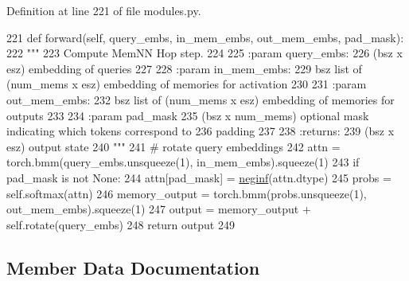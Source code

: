 Definition at line 221 of file modules.\+py.


\begin{DoxyCode}
221     \textcolor{keyword}{def }forward(self, query\_embs, in\_mem\_embs, out\_mem\_embs, pad\_mask):
222         \textcolor{stringliteral}{"""}
223 \textcolor{stringliteral}{        Compute MemNN Hop step.}
224 \textcolor{stringliteral}{}
225 \textcolor{stringliteral}{        :param query\_embs:}
226 \textcolor{stringliteral}{            (bsz x esz) embedding of queries}
227 \textcolor{stringliteral}{}
228 \textcolor{stringliteral}{        :param in\_mem\_embs:}
229 \textcolor{stringliteral}{            bsz list of (num\_mems x esz) embedding of memories for activation}
230 \textcolor{stringliteral}{}
231 \textcolor{stringliteral}{        :param out\_mem\_embs:}
232 \textcolor{stringliteral}{            bsz list of (num\_mems x esz) embedding of memories for outputs}
233 \textcolor{stringliteral}{}
234 \textcolor{stringliteral}{        :param pad\_mask}
235 \textcolor{stringliteral}{            (bsz x num\_mems) optional mask indicating which tokens correspond to}
236 \textcolor{stringliteral}{            padding}
237 \textcolor{stringliteral}{}
238 \textcolor{stringliteral}{        :returns:}
239 \textcolor{stringliteral}{            (bsz x esz) output state}
240 \textcolor{stringliteral}{        """}
241         \textcolor{comment}{# rotate query embeddings}
242         attn = torch.bmm(query\_embs.unsqueeze(1), in\_mem\_embs).squeeze(1)
243         \textcolor{keywordflow}{if} pad\_mask \textcolor{keywordflow}{is} \textcolor{keywordflow}{not} \textcolor{keywordtype}{None}:
244             attn[pad\_mask] = \hyperlink{namespaceparlai_1_1utils_1_1misc_a68c44ca571de7149b683539db659c330}{neginf}(attn.dtype)
245         probs = self.softmax(attn)
246         memory\_output = torch.bmm(probs.unsqueeze(1), out\_mem\_embs).squeeze(1)
247         output = memory\_output + self.rotate(query\_embs)
248         \textcolor{keywordflow}{return} output
249 \end{DoxyCode}


\subsection{Member Data Documentation}
\mbox{\label{classparlai_1_1agents_1_1memnn_1_1modules_1_1Hop_a88857c10815bc48ef24c78ecf367935d}} 
